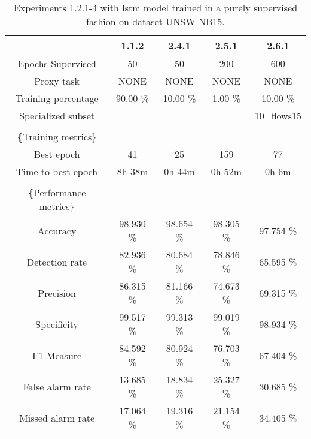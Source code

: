\begin{table}[htb]
    \centering
    \begin{tabular}{@{}ccccc@{}}
        \toprule
         & 1.1.2 & 2.4.1 & 2.5.1 & 2.6.1 \\
        \midrule
        Epochs Supervised &  50 &  50 &  200 &  600 \\
        Proxy task &  NONE &  NONE &  NONE &  NONE \\
        Training percentage &  90.00 \% &  10.00 \% &  1.00 \% &  10.00 \% \\
        Specialized subset &   &   &   &  10\_flows15 \\
         \\
        \textbf\{Training metrics\} &  &  &  &  \\
        Best epoch &  41 &  25 &  159 &  77 \\
        Time to best epoch &  8h 38m &  0h 44m &  0h 52m &  0h 6m \\
         \\
        \textbf\{Performance metrics\} &  &  &  &  \\
        Accuracy &  98.930 \% &  98.654 \% &  98.305 \% &  97.754 \% \\
        Detection rate &  82.936 \% &  80.684 \% &  78.846 \% &  65.595 \% \\
        Precision &  86.315 \% &  81.166 \% &  74.673 \% &  69.315 \% \\
        Specificity &  99.517 \% &  99.313 \% &  99.019 \% &  98.934 \% \\
        F1-Measure &  84.592 \% &  80.924 \% &  76.703 \% &  67.404 \% \\
        False alarm rate &  13.685 \% &  18.834 \% &  25.327 \% &  30.685 \% \\
        Missed alarm rate &  17.064 \% &  19.316 \% &  21.154 \% &  34.405 \% \\
        \bottomrule
    \end{tabular}
    \caption{Experiments 1.2.1-4 with \gls{lstm} model trained in a purely supervised fashion on dataset UNSW-NB15.}
    \label{table:results:lstm:stats_flows15_supervised}
\end{table}